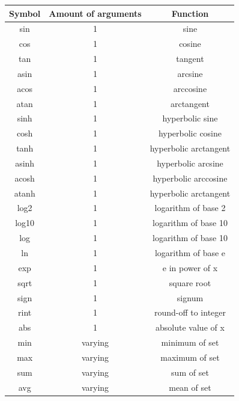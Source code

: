 \documentclass[a4paper, 11pt]{article}
\begin{document}
	\begin{center}
	\begin{tabular}{| c | c | c |}
		\hline
		\textbf{Symbol} & \textbf{Amount of arguments} & \textbf{Function}\\ \hline
		sin & 1 & sine\\ \hline
		cos & 1 & cosine\\ \hline
		tan & 1 & tangent\\ \hline
		asin & 1 & arcsine\\ \hline
		acos & 1 & arccosine\\ \hline
		atan & 1 & arctangent\\ \hline
		sinh & 1 & hyperbolic sine\\ \hline
		cosh & 1 & hyperbolic cosine \\ \hline
		tanh & 1 & hyperbolic arctangent\\ \hline
		asinh & 1 & hyperbolic arcsine\\ \hline
		acosh & 1 & hyperbolic arccosine \\ \hline
		atanh & 1 & hyperbolic arctangent\\ \hline
		log2 & 1 & logarithm of base 2\\ \hline
		log10 & 1 & logarithm of base 10 \\ \hline
		log & 1 & logarithm of base 10\\ \hline
		ln & 1 & logarithm of base e\\ \hline
		exp & 1 & e in power of x\\ \hline
		sqrt & 1 & square root\\ \hline
		sign & 1 & signum\\ \hline
		rint & 1 & round-off to integer\\ \hline
		abs & 1 & absolute value of x\\ \hline
		min & varying & minimum of set\\ \hline
		max & varying & maximum of set\\ \hline
		sum & varying & sum of set\\ \hline
		avg & varying & mean of set\\
		\hline
	\end{tabular}			
	\end{center}
	
\end{document}
